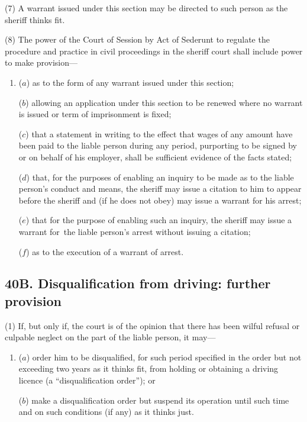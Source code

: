 \documentclass[12pt,a4paper]{article}
\begin{document}
(7) A warrant issued under this section may be directed to such person as the sheriff thinks fit.

(8) The power of the Court of Session by Act of Sederunt to regulate the procedure and practice in civil proceedings in the sheriff court shall include power to make provision—
\begin{enumerate}\item[]
($a$) as to the form of any warrant issued under this section;

($b$) allowing an application under this section to be renewed where no warrant is issued or term of imprisonment is fixed;

($c$) that a statement in writing to the effect that wages of any amount have been paid to the liable person during any period, purporting to be signed by or on behalf of his employer, shall be sufficient evidence of the facts stated;

($d$) that, for the purposes of enabling an inquiry to be made as to the liable person’s conduct and means, the sheriff may issue a citation to him to appear before the sheriff and (if he does not obey) may issue a warrant for his arrest;

($e$) that for the purpose of enabling such an inquiry, the sheriff may issue a warrant for~the liable person’s arrest without issuing a citation;

($f$) as to the execution of a warrant of arrest.
\end{enumerate}


\subsection{40B. Disqualification from driving: further provision}
 
(1) If, but only if, the court is of the opinion that there has been wilful refusal or culpable neglect on the part of the liable person, it may—
\begin{enumerate}\item[]
($a$) order him to be disqualified, for such period specified in the order but not exceeding two years as it thinks fit, from holding or obtaining a driving licence (a “disqualification order”); or

($b$) make a disqualification order but suspend its operation until such time and on such conditions (if any) as it thinks just.
\end{enumerate}
\end{document}
